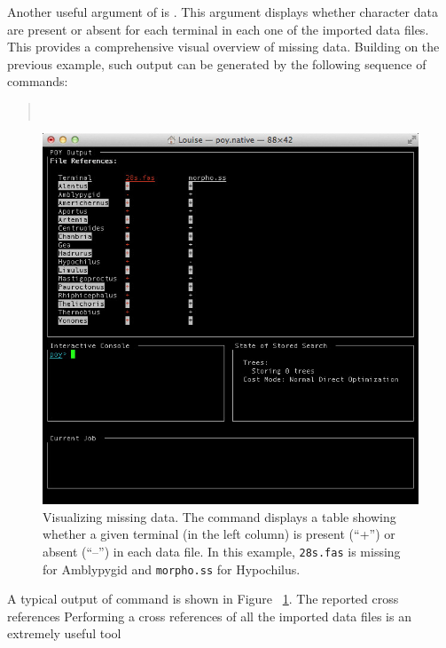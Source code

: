 {Another useful argument of  is . This argument displays whether 
character data are present or absent for each terminal in each one of the imported data files. This provides a 
comprehensive 
visual overview of missing data. Building on the previous example, such output can be generated by the following 
sequence of commands:
\begin{quote}
    \\
\end{quote}

\begin{figure}[]
    \begin{center}
        \includegraphics[width=1.0\textwidth]{doc/figures/crossref.jpg}
    \end{center}
    \caption{Visualizing missing data. The command  displays a table showing whether 
    a given terminal (in the left column) is present (``+'') or absent (``--'') in each data file. In this example, \texttt{28s.fas} 
    is missing for Amblypygid and \texttt{morpho.ss} for Hypochilus.}
    \label{fig:crossref}
\end{figure}

A typical output of  command is shown in Figure ~\ref{fig:crossref}. The reported cross 
references Performing a
cross references of all the imported data files is an extremely useful tool


}
